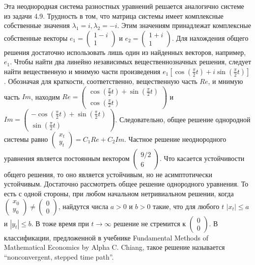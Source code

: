 \begin{solution}
Эта неоднородная система разностных уравнений решается  аналогично системе из задачи 4.9. Трудность в том, что матрица системы имеет комплексные собственные значения $\lambda _{1} =i, \lambda _{2} =-i$. Этим значениям принадлежат комплексные собственные векторы $e_{1} =\left(\begin{array}{c} {1-i} \\ {1} \end{array}\right)$ и $e_{2} =\left(\begin{array}{c} {1+i} \\ {1} \end{array}\right)$. Для нахождения общего решения достаточно использовать лишь один из найденных векторов, например, $e_{1} $. Чтобы найти два линейно независимых вещественнозначных решения, следует найти вещественную и мнимую части произведения $e_{1} \left[\cos (\frac{\pi }{2} t)+i\sin (\frac{\pi }{2} t)\right]$. Обозначая для краткости, соответственно, вещественную часть $Re$, и мнимую часть $Im$, находим $Re=\left(\begin{array}{c} {\cos (\frac{\pi }{2} t)+\sin (\frac{\pi }{2} t)} \\ {\cos (\frac{\pi }{2} t)} \end{array}\right)$ и $Im=\left(\begin{array}{c} {-\cos (\frac{\pi }{2} t)+\sin (\frac{\pi }{2} t)} \\ {\sin (\frac{\pi }{2} t)} \end{array}\right)$. Следовательно, общее решение однородной системы равно $\left(\begin{array}{c} {x_{t} } \\ {y_{t} } \end{array}\right)=C_{1} Re+C_{2} Im$. Частное решение неоднородного уравнения является постоянным вектором $\left(\begin{array}{c} {9/2} \\ {6} \end{array}\right)$.  Что касается устойчивости общего решения, то оно является устойчивым, но не асимптотически устойчивым.  Достаточно рассмотреть общее решение однородного уравнения. То есть с одной стороны, при любом начальном нетривиальном решении, когда $\left(\begin{array}{c} {x_{0} } \\ {y_{0} } \end{array}\right)\ne \left(\begin{array}{c} {0} \\ {0} \end{array}\right)$, найдутся числа $a>0$ и $b>0$ такие, что  для любого $t$ $\left|x_{t} \right|\le a$ и $\left|y_{t} \right|\le b$. В тоже время при $t\to \infty $ решение не стремится к $\left(\begin{array}{c} {0} \\ {0} \end{array}\right)$. В классификации, предложенной в учебнике Fundamental Methods of Mathematical Economics by Alpha C. Chiang, такое решение называется ``nonconvergent, stepped time path''.
\end{solution}
